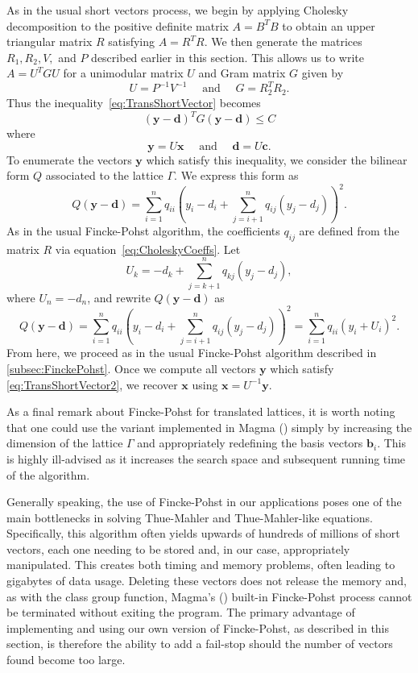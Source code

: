 As in the usual short vectors process, we begin by applying Cholesky decomposition to the positive definite matrix $A=B^TB$ to obtain an upper triangular matrix $R$ satisfying $A = R^TR$. We then generate the matrices $R_1, R_2, V,$ and $P$ described earlier in this section. This allows us to write $A = U^TGU$ for a unimodular matrix $U$ and Gram matrix $G$ given by
\[U = P^{-1}V^{-1} \quad \text{ and } \quad G = R_2^TR_2.\]
Thus the inequality~\eqref{eq:TransShortVector} becomes
\begin{equation} \label{eq:TransShortVector2}
(\mathbf{y}-\mathbf{d})^TG(\mathbf{y}-\mathbf{d}) \leq C
\end{equation}
where
\[\mathbf{y} = U\mathbf{x} \quad \text{ and } \quad \mathbf{d} = U\mathbf{c}.\]
To enumerate the vectors $\mathbf{y}$ which satisfy this inequality, we consider the bilinear form $Q$ associated to the lattice $\Gamma$. We express this form as
\[ Q(\mathbf{y}-\mathbf{d}) = \sum_{i=1}^n q_{ii}\left( y_i - d_i + \sum_{j=i+1}^n q_{ij}(y_j - d_j)\right)^2.\]
As in the usual Fincke-Pohst algorithm, the coefficients $q_{ij}$ are defined from the matrix $R$ via equation~\eqref{eq:CholeskyCoeffs}. Let
\[U_k = -d_k + \sum_{j = k+1}^n q_{kj}(y_j - d_j),\]
where $U_n = -d_n$, and rewrite $Q(\mathbf{y}-\mathbf{d})$ as
\[ Q(\mathbf{y}-\mathbf{d}) = \sum_{i=1}^n q_{ii}\left( y_i - d_i + \sum_{j=i+1}^n q_{ij}(y_j - d_j)\right)^2 = \sum_{i=1}^n q_{ii}\left( y_i + U_i\right)^2.\]
From here, we proceed as in the usual Fincke-Pohst algorithm described in \autoref{subsec:FinckePohst}. Once we compute all vectors $\mathbf{y}$ which satisfy \eqref{eq:TransShortVector2}, we recover $\mathbf{x}$ using $\mathbf{x} = U^{-1}\mathbf{y}$. 

As a final remark about Fincke-Pohst for translated lattices, it is worth noting that one could use the variant implemented in Magma () simply by increasing the dimension of the lattice $\Gamma$ and appropriately redefining the basis vectors $\mathbf{b}_i$. This is highly ill-advised as it increases the search space and subsequent running time of the algorithm.  

Generally speaking, the use of Fincke-Pohst in our applications poses one of the main bottlenecks in solving Thue-Mahler and Thue-Mahler-like equations. Specifically, this algorithm often yields upwards of hundreds of millions of short vectors, each one needing to be stored and, in our case, appropriately manipulated. This creates both timing and memory problems, often leading to gigabytes of data usage. Deleting these vectors does not release the memory and, as with the class group function, Magma's () built-in Fincke-Pohst process cannot be terminated without exiting the program. The primary advantage of implementing and using our own version of Fincke-Pohst, as described in this section, is therefore the ability to add a fail-stop should the number of vectors found become too large.   

